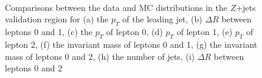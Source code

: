 \begin{figure}[H]
    \\
    \\
    \\
    \caption{Comparisons between the data and MC distributions in the $Z$+jets validation region for (a) the $p_T$ of the leading jet, (b) $\Delta R$ between leptons 0 and 1, (c) the $p_T$ of lepton 0, (d) $p_T$ of lepton 1, (e) $p_T$ of lepton 2, (f) the invariant mass of leptons 0 and 1, (g) the invariant mass of leptons 0 and 2, (h) the number of jets, (i) $\Delta R$ between leptons 0 and 2}%
    \label{zjets_kinematics}
\end{figure}

